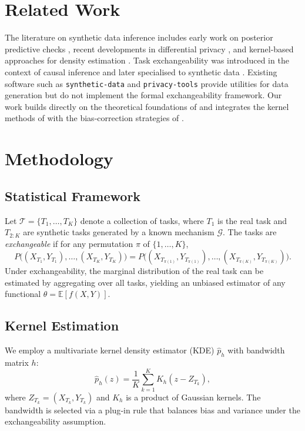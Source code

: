 \documentclass[11pt,a4paper]{article}
\begin{document}
\section{Related Work}
The literature on synthetic data inference includes early work on posterior predictive checks \citep{Rubin1993}, recent developments in differential privacy \citep{Dwork2014}, and kernel‑based approaches for density estimation \citep{Silverman1986}.  Task exchangeability was introduced in the context of causal inference \citep{Pearl2009} and later specialised to synthetic data \citep{Gandhi2022}.  Existing software such as \texttt{synthetic-data} \citep{synthetic2021} and \texttt{privacy‑tools} \citep{privacy2020} provide utilities for data generation but do not implement the formal exchangeability framework.  Our work builds directly on the theoretical foundations of \citet{Gandhi2022} and integrates the kernel methods of \citet{Silverman1986} with the bias‑correction strategies of \citet{Berger1999}.

\section{Methodology}
\subsection{Statistical Framework}
Let $\mathcal{T} = \{T_1,\dots,T_K\}$ denote a collection of tasks, where $T_1$ is the real task and $T_{2:K}$ are synthetic tasks generated by a known mechanism $\mathcal{G}$.  The tasks are \emph{exchangeable} if for any permutation $\pi$ of $\{1,\dots,K\}$,
\[
P\bigl( (X_{T_1},Y_{T_1}),\dots,(X_{T_K},Y_{T_K}) \bigr)
=
P\bigl( (X_{T_{\pi(1)}},Y_{T_{\pi(1)}}),\dots,(X_{T_{\pi(K)}},Y_{T_{\pi(K)}}) \bigr).
\]
Under exchangeability, the marginal distribution of the real task can be estimated by aggregating over all tasks, yielding an unbiased estimator of any functional $\theta = \mathbb{E}[f(X,Y)]$.

\subsection{Kernel Estimation}
We employ a multivariate kernel density estimator (KDE) $\hat{p}_h$ with bandwidth matrix $h$:
\[
\hat{p}_h(z) = \frac{1}{K}\sum_{k=1}^K K_h(z - Z_{T_k}),
\]
where $Z_{T_k} = (X_{T_k},Y_{T_k})$ and $K_h$ is a product of Gaussian kernels.  The bandwidth is selected via a plug‑in rule that balances bias and variance under the exchangeability assumption.
\end{document}
